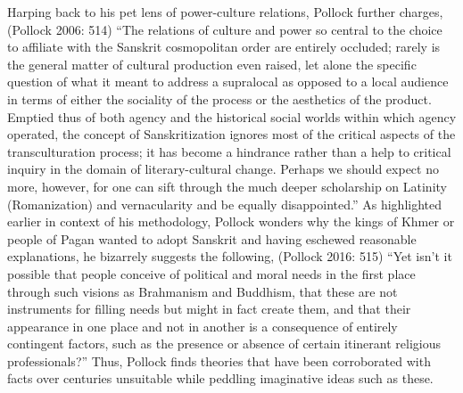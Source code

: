 Harping back to his pet lens of power-culture relations, Pollock further charges, (Pollock 2006: 514) “The relations of culture and power so central to the choice to affiliate with the Sanskrit cosmopolitan order are entirely occluded; rarely is the general matter of cultural production even raised, let alone the specific question of what it meant to address a supralocal as opposed to a local audience in terms of either the sociality of the process or the aesthetics of the product. Emptied thus of both agency and the historical social worlds within which agency operated, the concept of Sanskritization ignores most of the critical aspects of the transculturation process; it has become a hindrance rather than a help to critical inquiry in the domain of literary-cultural change. Perhaps we should expect no more, however, for one can sift through the much deeper scholarship on Latinity (Romanization) and vernacularity and be equally disappointed.” As highlighted earlier in context of his methodology, Pollock wonders why the kings of Khmer or people of Pagan wanted to adopt Sanskrit and having eschewed reasonable explanations, he bizarrely suggests the following, (Pollock 2016: 515) “Yet isn’t it possible that people conceive of political and moral needs in the first place through such visions as Brahmanism and Buddhism, that these are not instruments for filling needs but might in fact create them, and that their appearance in one place and not in another is a consequence of entirely contingent factors, such as the presence or absence of certain itinerant religious professionals?” Thus, Pollock finds theories that have been corroborated with facts over centuries unsuitable while peddling imaginative ideas such as these.

